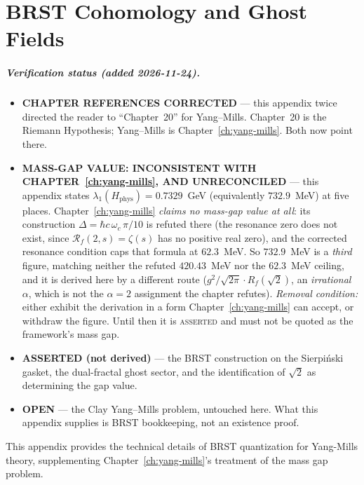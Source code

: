 \chapter{BRST Cohomology and Ghost Fields}
\label{app:brst}

\paragraph{Verification status (added 2026-11-24).}
\begin{itemize}
\item \textbf{CHAPTER REFERENCES CORRECTED} --- this appendix twice directed
  the reader to ``Chapter~20'' for Yang--Mills. Chapter~20 is the Riemann
  Hypothesis; Yang--Mills is Chapter~\ref{ch:yang-mills}. Both now point there.
\item \textbf{MASS-GAP VALUE: INCONSISTENT WITH
  CHAPTER~\ref{ch:yang-mills}, AND UNRECONCILED} --- this appendix states
  $\lambda_1(H_{\text{phys}}) = 0.7329$~GeV (equivalently $732.9$~MeV) at five
  places. Chapter~\ref{ch:yang-mills} \emph{claims no mass-gap value at all}:
  its construction $\Delta = \hbar c\,\omega_c\,\pi/10$ is refuted there (the
  resonance zero does not exist, since $\mathcal{R}_f(2,s) = \zeta(s)$ has no
  positive real zero), and the corrected resonance condition caps that formula
  at $62.3$~MeV. So $732.9$~MeV is a \emph{third} figure, matching neither the
  refuted $420.43$~MeV nor the $62.3$~MeV ceiling, and it is derived here by a
  different route ($g^2/\sqrt{2\pi} \cdot R_f(\sqrt2)$, an \emph{irrational}
  $\alpha$, which is not the $\alpha = 2$ assignment the chapter refutes).
  \emph{Removal condition:} either exhibit the derivation in a form
  Chapter~\ref{ch:yang-mills} can accept, or withdraw the figure. Until then it
  is \textsc{asserted} and must not be quoted as the framework's mass gap.
\item \textbf{ASSERTED (not derived)} --- the BRST construction on the
  Sierpi\'nski gasket, the dual-fractal ghost sector, and the identification of
  $\sqrt2$ as determining the gap value.
\item \textbf{OPEN} --- the Clay Yang--Mills problem, untouched here. What this
  appendix supplies is BRST bookkeeping, not an existence proof.
\end{itemize}

This appendix provides the technical details of BRST quantization for Yang-Mills theory, supplementing Chapter~\ref{ch:yang-mills}'s treatment of the mass gap problem.

